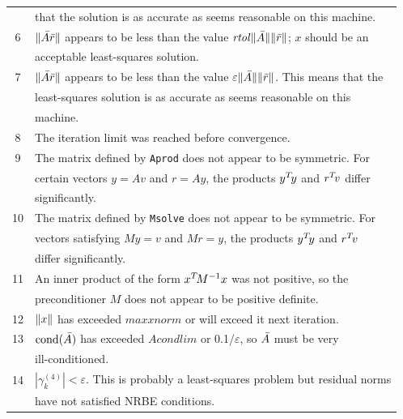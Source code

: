 \documentclass{doc_acmtrans2m}
\begin{document}
\begin{center}
\begin{longtable}{c l}
\\           & that the solution is as accurate as seems reasonable on this machine.
\\[1.5ex]  6 & $\norm{\Abar\rbar}$ appears to be less than the value
             $\mathit{rtol} \norm{\Abar} \norm{\rbar}$; $x$ should be an
\\           & acceptable least-squares solution.
\\[1.5ex]  7 & $\norm{\Abar\rbar}$ appears to be less than the value
             $\varepsilon \norm{\Abar} \norm{\rbar}$. This means that the
\\           & least-squares solution is as accurate as seems reasonable
             on this
\\           & machine.
\\[1.5ex]  8 & The iteration limit was reached before convergence.
\\[1.5ex]  9 & The matrix defined by  \texttt{Aprod} does not appear to
             be symmetric. For
\\           & certain vectors $y = Av$ and $r = Ay$, the products
             $y\T y$ and $r\T v$ differ
\\           & significantly.
\\[1.5ex] 10 & The matrix defined by \texttt{Msolve} does not appear to
             be symmetric.  For
\\           & vectors satisfying $My = v$ and $Mr = y$, the products
             $y\T y$ and $r\T v$
\\           & differ significantly.
\\[1.5ex] 11 & An inner product of the form  $x\T M^{-1} x$ was not
             positive, so the
\\           & preconditioner $M$ does not appear to be positive
             definite.
\\[1.5ex] 12 & $\norm{x}$ has exceeded $\mathit{maxxnorm}$ or will exceed it next iteration.
\\[1.5ex] 13 & $\cond(\Abar)$  has exceeded $\mathit{Acondlim}$ or 0.1/$\varepsilon$, so $\Abar$
             must be very
\\           & ill-conditioned.
\\[1.5ex] 14 & $|\gamma_k^{(4)}| < \varepsilon$. This is probably a
             least-squares problem but residual norms  
\\           &  have not satisfied NRBE conditions.  
\\[1.5ex]\hline
\end{longtable}
\end{center}
\vspace{-1\baselineskip}
\end{document}
